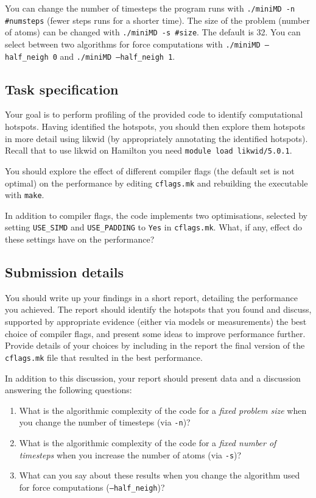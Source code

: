 \documentclass[a4paper]{article}
\begin{document}
You can change the number of timesteps the program runs with
\texttt{./miniMD -n \#numsteps} (fewer steps runs for a shorter time).
The size of the problem (number of atoms) can be changed with
\texttt{./miniMD -s \#size}. The default is 32.
You can select between two algorithms for force computations with
\texttt{./miniMD --half\_neigh 0} and \texttt{./miniMD --half\_neigh 1}.

\subsection{Task specification}
\label{sec:task}
Your goal is to perform profiling of the provided code to identify
computational hotspots. Having identified the hotspots, you should
then explore them hotspots in more detail using likwid (by
appropriately annotating the identified hotspots). Recall that to use
likwid on Hamilton you need \texttt{module load likwid/5.0.1}.

You should explore the effect of different compiler flags (the default
set is not optimal) on the performance by editing \texttt{cflags.mk}
and rebuilding the executable with \texttt{make}.

In addition to compiler flags, the code implements two optimisations,
selected by setting \texttt{USE\_SIMD} and \texttt{USE\_PADDING} to
\texttt{Yes} in \texttt{cflags.mk}. What, if any, effect do these
settings have on the performance?


\subsection{Submission details}
\label{sec:submission}

You should write up your findings in a short report, detailing the
performance you achieved. The report should identify the hotspots that
you found and discuss, supported by appropriate evidence (either via
models or measurements) the best choice of compiler flags, and present
some ideas to improve performance further. Provide details of your
choices by including in the report the final version of the
\texttt{cflags.mk} file that resulted in the best performance.

In addition to this discussion, your report should present data and a
discussion answering the following questions:
\begin{enumerate}
\item What is the algorithmic complexity of the code for a \emph{fixed
    problem size} when you change the number of timesteps (via
  \texttt{-n})?
\item What is the algorithmic complexity of the code for a \emph{fixed
    number of timesteps} when you increase the number of atoms (via
  \texttt{-s})?
\item What can you say about these results when you change the
  algorithm used for force computations (\texttt{--half\_neigh})?
\end{enumerate}
\end{document}
